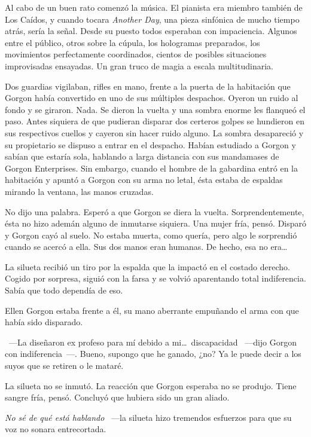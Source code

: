 \parbreak
Al cabo de un buen rato comenzó la música. El pianista era miembro también de Los Caídos, y cuando tocara \emph{Another Day}, una pieza sinfónica de mucho tiempo atrás, sería la señal. Desde su puesto todos esperaban con impaciencia. Algunos entre el público, otros sobre la cúpula, los hologramas preparados, los movimientos perfectamente coordinados, cientos de posibles situaciones improvisadas ensayadas. Un gran truco de magia a escala multitudinaria.

Dos guardias vigilaban, rifles en mano, frente a la puerta de la habitación que Gorgon había convertido en uno de sus múltiples despachos. Oyeron un ruido al fondo y se giraron. Nada. Se dieron la vuelta y una sombra enorme les flanqueó el paso. Antes siquiera de que pudieran disparar dos certeros golpes se hundieron en sus respectivos cuellos y cayeron sin hacer ruido alguno. La sombra desapareció y su propietario se dispuso a entrar en el despacho. Habían estudiado a Gorgon y sabían que estaría sola, hablando a larga distancia con sus mandamases de Gorgon Enterprises. Sin embargo, cuando el hombre de la gabardina entró en la habitación y apuntó a Gorgon con su arma no letal, ésta estaba de espaldas mirando la ventana, las manos cruzadas.

No dijo una palabra. Esperó a que Gorgon se diera la vuelta. Sorprendentemente, ésta no hizo ademán alguno de inmutarse siquiera. Una mujer fría, pensó. Disparó y Gorgon cayó al suelo. No estaba muerta, como quería, pero algo le sorprendió cuando se acercó a ella. Sus dos manos eran humanas. De hecho, esa no era\dots

La silueta recibió un tiro por la espalda que la impactó en el costado derecho. Cogido por sorpresa, siguió con la farsa y se volvió aparentando total indiferencia. Sabía que todo dependía de eso.

Ellen Gorgon estaba frente a él, su mano aberrante empuñando el arma con que había sido disparado.

~---La diseñaron ex profeso para mí debido a mi\dots\ discapacidad ~---dijo Gorgon con indiferencia~---. Bueno, supongo que he ganado, ¿no? Ya le puede decir a los suyos que se retiren o le mataré.

La silueta no se inmutó. La reacción que Gorgon esperaba no se produjo. Tiene sangre fría, pensó. Concluyó que hubiera sido un gran aliado.

\emph{No sé de qué está hablando} ~---la silueta hizo tremendos esfuerzos para que su voz no sonara entrecortada.

